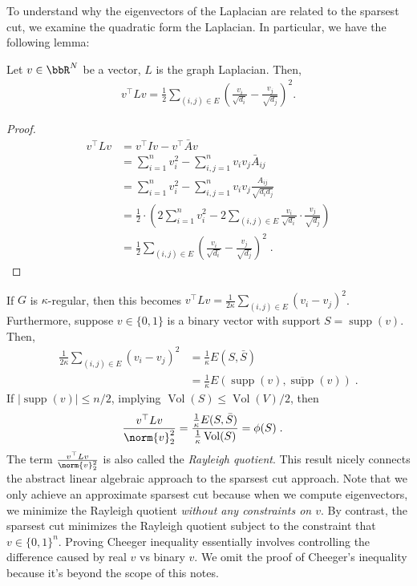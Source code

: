 To understand why the eigenvectors of the Laplacian are related to the sparsest cut, we examine the quadratic form the Laplacian. In particular, we have the following lemma:
\begin{lemma}\label{lemma:laplacian_quadratic}
	Let $v\in\bbR^N$ be a vector, $L$ is the graph Laplacian. Then, 
	\begin{align}
		v^\top L v = \frac{1}{2} \sum_{(i, j) \in E} \left( \frac{v_i}{\sqrt{d_i}} - \frac{v_j}{\sqrt{d_j}} \right)^2.
	\end{align}	
\end{lemma}
\begin{proof}
\begin{align}
	v^\top L v &= v^\top I v - v^\top \bar{A} v \\
	&= \sum_{i=1}^n v_i^2 - \sum_{i, j = 1}^n v_i v_j \bar{A}_{ij} \\
	&= \sum_{i=1}^n v_i^2 - \sum_{i, j = 1}^n v_i v_j \frac{A_{ij}}{\sqrt{d_i d_j}} \\
	&= \frac{1}{2}\cdot \left(2\sum_{i=1}^n v_i^2 - 2 \sum_{(i, j) \in E} \frac{v_i}{\sqrt{d_i}} \cdot \frac{v_j}{\sqrt{d_j}}\right) \\
	&= \frac{1}{2} \sum_{(i, j) \in E} \left( \frac{v_i}{\sqrt{d_i}} - \frac{v_j}{\sqrt{d_j}} \right)^2 \;.
\end{align}
\end{proof}

If $G$ is $\kappa$-regular, then this becomes $v^\top L v = \frac{1}{2\kappa} \sum_{(i, j) \in E} (v_i - v_j)^2$. Furthermore, suppose $v \in \{0, 1\}$ is a binary vector with support $S = \operatorname{supp}(v)$. Then, 
\begin{align}
    \frac{1}{2\kappa} \sum_{(i, j) \in E} (v_i - v_j)^2 &= \frac{1}{\kappa} E(S, \bar{S}) \\
    &= \frac{1}{\kappa} E(\operatorname{supp}(v), \overline{\operatorname{supp}}(v)) \;.
\end{align}
If $|\operatorname{supp}(v)| \leq n/2$, implying $\operatorname{Vol}(S) \leq \operatorname{Vol}(V)/2$, then
\begin{align}
    \frac{v^\top L v}{\norm{v}^2_2} &= \frac{\frac{1}{\kappa} E(S, \bar{S})}{\frac{1}{\kappa} \operatorname{Vol}(S)} = \phi(S) \;.
\end{align}
The term $\frac{v^\top L v}{\norm{v}^2_2}$ is also called the {\it Rayleigh quotient}. This result nicely connects the abstract linear algebraic approach to the sparsest cut approach. Note that we only achieve an approximate sparsest cut because when we compute eigenvectors, we minimize the Rayleigh quotient \emph{without any constraints on $v$}. By contrast, the sparsest cut minimizes the Rayleigh quotient subject to the constraint that $v \in \{0,1\}^n$. Proving Cheeger inequality essentially involves controlling the difference caused by real $v$ vs binary $v$. We omit the proof of Cheeger's inequality because it's beyond the scope of this notes. 

